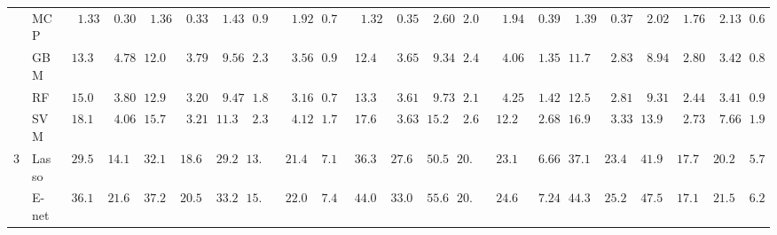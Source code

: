 \begin{tabular}{llllllllllllllllllllll}
	& MCP  & $\phantom{00}1.33$ & $\phantom{00}0.30$ & $\phantom{00}1.36$ & $\phantom{00}0.33$ & $\phantom{00}1.43$ & $\phantom{0}0.91$ & $\phantom{00}1.92$ & $\phantom{0}0.74$ & $\phantom{00}1.32$ & $\phantom{00}0.35$ & $\phantom{00}2.60$ & $\phantom{0}2.07$ & $\phantom{00}1.94$ & $\phantom{00}0.39$ & $\phantom{00}1.39$ & $\phantom{00}0.37$ & $\phantom{00}2.02$ & $\phantom{00}1.76$ & $\phantom{00}2.13$ & $\phantom{0}0.62$ \\
	& GBM  & $\phantom{0}13.34$ & $\phantom{00}4.78$ & $\phantom{0}12.06$ & $\phantom{00}3.79$ & $\phantom{00}9.56$ & $\phantom{0}2.38$ & $\phantom{00}3.56$ & $\phantom{0}0.95$ & $\phantom{0}12.43$ & $\phantom{00}3.65$ & $\phantom{00}9.34$ & $\phantom{0}2.48$ & $\phantom{00}4.06$ & $\phantom{00}1.35$ & $\phantom{0}11.74$ & $\phantom{00}2.83$ & $\phantom{00}8.94$ & $\phantom{00}2.80$ & $\phantom{00}3.42$ & $\phantom{0}0.84$ \\
	& RF  & $\phantom{0}15.01$ & $\phantom{00}3.80$ & $\phantom{0}12.93$ & $\phantom{00}3.20$ & $\phantom{00}9.47$ & $\phantom{0}1.82$ & $\phantom{00}3.16$ & $\phantom{0}0.77$ & $\phantom{0}13.32$ & $\phantom{00}3.61$ & $\phantom{00}9.73$ & $\phantom{0}2.12$ & $\phantom{00}4.25$ & $\phantom{00}1.42$ & $\phantom{0}12.51$ & $\phantom{00}2.81$ & $\phantom{00}9.31$ & $\phantom{00}2.44$ & $\phantom{00}3.41$ & $\phantom{0}0.93$ \\
	& SVM  & $\phantom{0}18.18$ & $\phantom{00}4.06$ & $\phantom{0}15.75$ & $\phantom{00}3.21$ & $\phantom{0}11.37$ & $\phantom{0}2.32$ & $\phantom{00}4.12$ & $\phantom{0}1.71$ & $\phantom{0}17.60$ & $\phantom{00}3.63$ & $\phantom{0}15.29$ & $\phantom{0}2.61$ & $\phantom{0}12.26$ & $\phantom{00}2.68$ & $\phantom{0}16.97$ & $\phantom{00}3.33$ & $\phantom{0}13.97$ & $\phantom{00}2.73$ & $\phantom{00}7.66$ & $\phantom{0}1.95$ \\
	3 & Lasso  & $\phantom{0}29.59$ & $\phantom{0}14.14$ & $\phantom{0}32.13$ & $\phantom{0}18.61$ & $\phantom{0}29.27$ & $13.88$ & $\phantom{0}21.48$ & $\phantom{0}7.12$ & $\phantom{0}36.38$ & $\phantom{0}27.60$ & $\phantom{0}50.59$ & $20.76$ & $\phantom{0}23.12$ & $\phantom{00}6.66$ & $\phantom{0}37.10$ & $\phantom{0}23.41$ & $\phantom{0}41.95$ & $\phantom{0}17.77$ & $\phantom{0}20.23$ & $\phantom{0}5.78$ \\
	& E-net  & $\phantom{0}36.11$ & $\phantom{0}21.63$ & $\phantom{0}37.22$ & $\phantom{0}20.50$ & $\phantom{0}33.26$ & $15.88$ & $\phantom{0}22.04$ & $\phantom{0}7.40$ & $\phantom{0}44.04$ & $\phantom{0}33.05$ & $\phantom{0}55.61$ & $20.21$ & $\phantom{0}24.65$ & $\phantom{00}7.24$ & $\phantom{0}44.32$ & $\phantom{0}25.21$ & $\phantom{0}47.57$ & $\phantom{0}17.17$ & $\phantom{0}21.58$ & $\phantom{0}6.23$ \\

\end{tabular}
